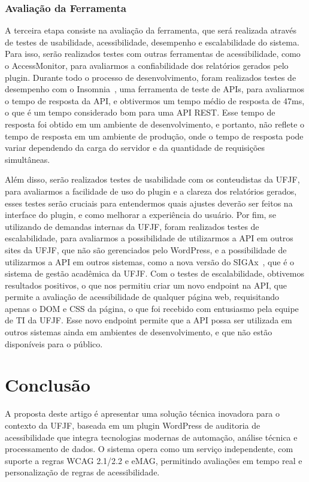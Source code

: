 \documentclass[12pt]{article}
\begin{document}
\subsubsection{Avaliação da Ferramenta}
A terceira etapa consiste na avaliação da ferramenta, que será realizada
através de testes de usabilidade, acessibilidade, desempenho e escalabilidade
do sistema. Para isso, serão realizados testes com outras ferramentas de
acessibilidade, como o AccessMonitor, para avaliarmos a
confiabilidade dos relatórios gerados pelo plugin. Durante todo o processo
de desenvolvimento, foram realizados testes de desempenho com o Insomnia~\autocite{insomnia},
uma ferramenta de teste de APIs, para avaliarmos o tempo de resposta da API,
e obtivermos um tempo médio de resposta de 47ms, o que é um tempo considerado
bom para uma API REST. Esse tempo de resposta foi obtido em um ambiente
de desenvolvimento, e portanto, não reflete o tempo de resposta em um
ambiente de produção, onde o tempo de resposta pode variar dependendo da
carga do servidor e da quantidade de requisições simultâneas.

Além disso, serão realizados testes de usabilidade com os conteudistas da 
UFJF, para avaliarmos a facilidade de uso do plugin e a clareza dos relatórios 
gerados, esses testes serão cruciais para entendermos quais ajustes deverão 
ser feitos na interface do plugin, e como melhorar a experiência do usuário. 
Por fim, se utilizando de demandas internas da UFJF, foram realizados testes 
de escalabilidade, para avaliarmos a possibilidade de utilizarmos a API 
em outros sites da UFJF, que não são gerenciados pelo WordPress, e a 
possibilidade de utilizarmos a API em outros sistemas, como a nova versão do 
SIGAx~\autocite{SIGAx}, que é o sistema de gestão acadêmica da UFJF\@. Com
o testes de escalabilidade, obtivemos resultados positivos, o que nos
permitiu criar um novo endpoint na API, que permite a avaliação de acessibilidade
de qualquer página web, requisitando apenas o DOM e CSS da página, o que foi recebido
com entusiasmo pela equipe de TI da UFJF\@. Esse novo endpoint permite que
a API possa ser utilizada em outros sistemas ainda em ambientes de desenvolvimento,
e que não estão disponíveis para o público.

\section{Conclusão}
A proposta deste artigo é apresentar uma solução técnica inovadora para o
contexto da UFJF, baseada em um plugin WordPress de auditoria de acessibilidade
que integra tecnologias modernas de automação, análise técnica e
processamento de dados. O sistema opera como um serviço independente, com
suporte a regras WCAG 2.1/2.2 e eMAG, permitindo avaliações em tempo real
e personalização de regras de acessibilidade.
\end{document}
